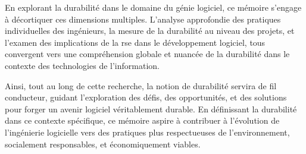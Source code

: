 En explorant la durabilité dans le domaine du génie logiciel, ce mémoire s'engage à décortiquer ces dimensions multiples. L'analyse approfondie des pratiques individuelles des ingénieurs, la mesure de la durabilité au niveau des projets, et l'examen des implications de la \acrshort{rse} dans le développement logiciel, tous convergent vers une compréhension globale et nuancée de la durabilité dans le contexte des technologies de l'information.


Ainsi, tout au long de cette recherche, la notion de durabilité servira de fil conducteur, guidant l'exploration des défis, des opportunités, et des solutions pour forger un avenir logiciel véritablement durable. En définissant la durabilité dans ce contexte spécifique, ce mémoire aspire à contribuer à l'évolution de l'ingénierie logicielle vers des pratiques plus respectueuses de l'environnement, socialement responsables, et économiquement viables.